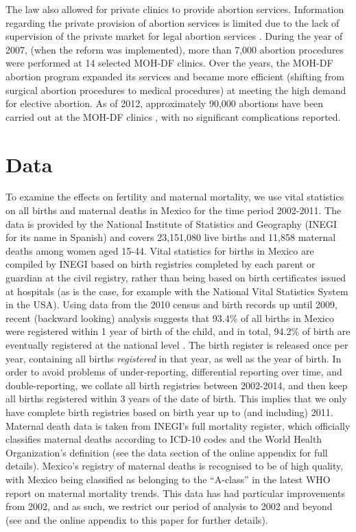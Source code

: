 \documentclass[a4paper, 11pt]{article}
\begin{document}
\begin{spacing}{2}
The law also allowed for private clinics to provide abortion services. Information regarding the private provision of abortion services is limited due to the lack of supervision of the private market for legal abortion services \citep{Becker}. During the year of 2007, (when the reform was implemented), more than 7,000 abortion procedures were performed at 14 selected MOH-DF clinics. Over the years, the MOH-DF abortion program expanded its services and became more efficient (shifting from surgical abortion procedures to medical procedures) at meeting the high demand for elective abortion. As of 2012, approximately 90,000 abortions have been carried out at the MOH-DF clinics \citep{Becker}, with no significant complications reported.

\section{Data}
\label{scn:data}
To examine the effects on fertility and maternal mortality, we use vital statistics on all births and maternal deaths in Mexico for the time period 2002-2011. The data is provided by the National Institute of Statistics and Geography (INEGI for its name in Spanish) and covers 23,151,080 live births and 11,858 maternal deaths among women aged 15-44.  Vital statistics for births in Mexico are compiled by INEGI based on birth registries completed by each parent or guardian at the civil registry, rather than being based on birth certificates issued at hospitals (as is the case, for example with the National Vital Statistics System in the USA).  Using data from the 2010 census and birth records up until 2009, recent (backward looking) analysis suggests that 93.4\% of all births in Mexico were registered within 1 year of birth of the child, and in total, 94.2\% of birth are eventually registered at the national level \citep{INEGI2012}.  The birth register is released once per year, containing all births \emph{registered} in that year, as well as the year of birth.  In order to avoid problems of under-reporting, differential reporting over time, and double-reporting, we collate all birth registries between 2002-2014, and then keep all births registered within 3 years of the date of birth.  This implies that we only have complete birth registries based on birth year up to (and including) 2011.  Maternal death data is taken from INEGI's full mortality register, which officially classifies maternal deaths according to ICD-10 codes and the World Health Organization's definition (see the data section of the online appendix for full details).  Mexico's registry of maternal deaths is recognised to be of high quality, with Mexico being classified as belonging to the ``A-class'' \citep{WHO1987} in the latest WHO report on maternal mortality trends.  This data has had particular improvements from 2002, and as such, we restrict our period of analysis to 2002 and beyond (see \citet{Schiavonetal2012} and the online appendix to this paper for further details).  


\end{spacing}
\end{document}
